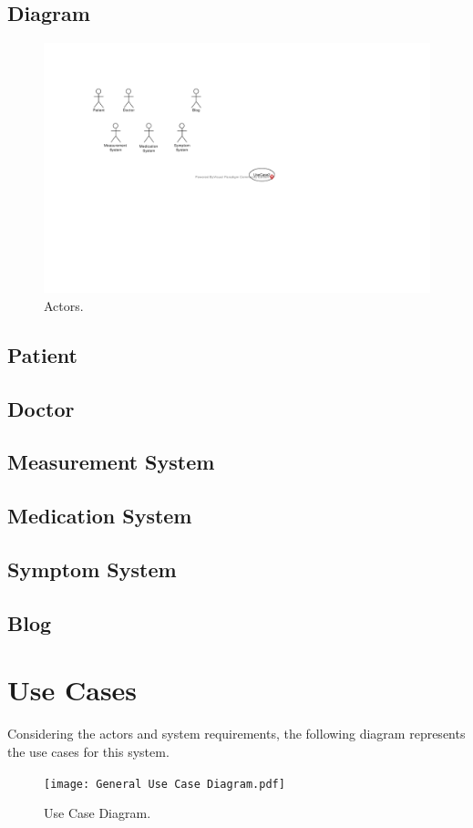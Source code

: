 \documentclass{report}
\begin{document}
\subsection{Diagram}
\begin{figure}[ht]
    \centering
    \includegraphics[width=0.5\linewidth]{Actors.pdf}
    \caption{Actors.}
    \label{fig:Actors}
\end{figure}

\subsection{Patient}
\subsection{Doctor}
\subsection{Measurement System}
\subsection{Medication System}
\subsection{Symptom System}
\subsection{Blog}

\clearpage
\section{Use Cases}
Considering the actors and system requirements, the following diagram represents the use cases for this system.

\begin{figure}[hb]
    \centering
    \texttt{[image: General Use Case Diagram.pdf]}
    \caption{Use Case Diagram.}
    \label{fig:Use Case}
\end{figure}
\end{document}
